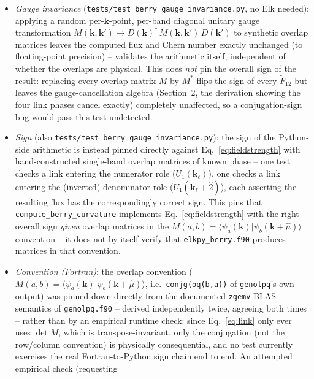 \documentclass[11pt]{article}
\begin{document}
\begin{itemize}
  \item \emph{Gauge invariance} (\texttt{tests/test\_berry\_gauge\_invariance.py}, no
    Elk needed): applying a random per-$\mathbf k$-point, per-band diagonal unitary
    gauge transformation $M(\mathbf k,\mathbf k') \to D(\mathbf k)^\dagger\, M(\mathbf
    k,\mathbf k')\, D(\mathbf k')$ to synthetic overlap matrices leaves the computed
    flux and Chern number exactly unchanged (to floating-point precision) -- validates
    the arithmetic itself, independent of whether the overlaps are physical. This does
    \emph{not} pin the overall sign of the result: replacing every overlap matrix $M$
    by $M^*$ flips the sign of every $\tilde F_{12}$ but leaves the gauge-cancellation
    algebra (Section~2, the derivation showing the four link phases cancel exactly)
    completely unaffected, so a conjugation-sign bug would pass this test undetected.
  \item \emph{Sign} (also \texttt{tests/test\_berry\_gauge\_invariance.py}): the sign of
    the Python-side arithmetic is instead pinned directly against Eq.~\eqref{eq:fieldstrength}
    with hand-constructed single-band overlap matrices of known phase -- one test checks
    a link entering the numerator role ($U_1(\mathbf k_\ell)$), one checks a link entering
    the (inverted) denominator role ($U_1(\mathbf k_\ell+\hat 2)$), each asserting the
    resulting flux has the correspondingly correct sign. This pins that
    \texttt{compute\_berry\_curvature} implements Eq.~\eqref{eq:fieldstrength} with the
    right overall sign \emph{given} overlap matrices in the
    $M(a,b)=\langle\psi_a(\mathbf k)|\psi_b(\mathbf k+\hat\mu)\rangle$ convention -- it
    does not by itself verify that \texttt{elkpy\_berry.f90} produces matrices in that
    convention.
  \item \emph{Convention (Fortran)}: the overlap convention
    ($M(a,b)=\langle\psi_a(\mathbf k)|\psi_b(\mathbf k+\hat\mu)\rangle$, i.e.\
    \texttt{conjg(oq(b,a))} of \texttt{genolpq}'s own output) was pinned down directly
    from the documented \texttt{zgemv} BLAS semantics of \texttt{genolpq.f90} --
    derived independently twice, agreeing both times -- rather than by an empirical
    runtime check: since Eq.~\eqref{eq:link} only ever uses $\det M$, which is
    transpose-invariant, only the conjugation (not the row/column convention) is
    physically consequential, and no test currently exercises the real
    Fortran-to-Python sign chain end to end. An attempted empirical check (requesting

\end{itemize}
\end{document}
